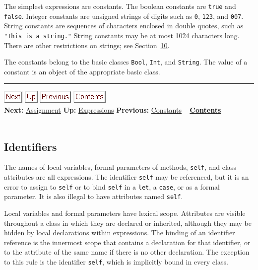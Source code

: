 \documentclass[]{article}
\begin{document}
The simplest expressions are constants. The boolean constants are
\texttt{true} and \texttt{false}. Integer constants are unsigned strings
of digits such as \texttt{0}, \texttt{123}, and \texttt{007}. String
constants are sequences of characters enclosed in double quotes, such as
\texttt{"This is a string."} String constants may be at most 1024
characters long. There are other restrictions on strings; see
Section~\href{node33.html\#lex-struct}{10}.

The constants belong to the basic classes \texttt{Bool}, \texttt{Int},
and \texttt{String}. The value of a constant is an object of the
appropriate basic class.

\begin{center}\rule{3in}{0.4pt}\end{center}

\href{node16.html}{\includegraphics{next.png}}
\href{node13.html}{\includegraphics{up.png}}
\href{node14.html}{\includegraphics{prev.png}}
\href{node1.html}{\includegraphics{contents.png}} \\ \textbf{Next:}
\href{node16.html}{Assignment} \textbf{Up:}
\href{node13.html}{Expressions} \textbf{Previous:}
\href{node14.html}{Constants} ~ \textbf{\href{node1.html}{Contents}} \\
\\

\subsection{Identifiers}

The names of local variables, formal parameters of methods,
\texttt{self}, and class attributes are all expressions. The identifier
\texttt{self} may be referenced, but it is an error to assign to
\texttt{self} or to bind \texttt{self} in a \texttt{let}, a
\texttt{case}, or as a formal parameter. It is also illegal to have
attributes named \texttt{self}.

Local variables and formal parameters have lexical scope. Attributes are
visible throughout a class in which they are declared or inherited,
although they may be hidden by local declarations within expressions.
The binding of an identifier reference is the innermost scope that
contains a declaration for that identifier, or to the attribute of the
same name if there is no other declaration. The exception to this rule
is the identifier \texttt{self}, which is implicitly bound in every
class.
\end{document}
